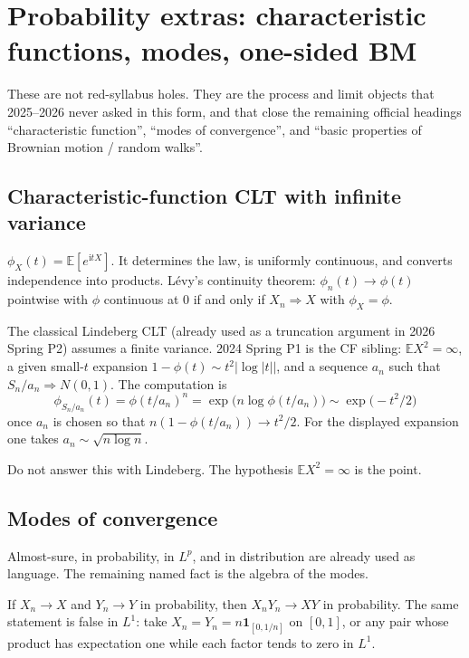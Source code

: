 \section{Probability extras: characteristic functions, modes, one-sided BM}
\label{sec:prob}

These are not red-syllabus holes. They are the process and limit objects that 2025--2026 never asked in this form, and that close the remaining official headings ``characteristic function'', ``modes of convergence'', and ``basic properties of Brownian motion / random walks''.

\subsection{Characteristic-function CLT with infinite variance}

\begin{definition}
\label{def:cf}
\(\phi_{X}(t)=\mathbb{E}[e^{\mathrm{i}tX}]\). It determines the law, is uniformly continuous, and converts independence into products. L\'evy's continuity theorem: \(\phi_{n}(t)\to\phi(t)\) pointwise with \(\phi\) continuous at \(0\) if and only if \(X_{n}\Rightarrow X\) with \(\phi_{X}=\phi\).
\end{definition}

The classical Lindeberg CLT (already used as a truncation argument in 2026 Spring P2) assumes a finite variance. 2024 Spring P1 is the CF sibling: \(\mathbb{E}X^{2}=\infty\), a given small-\(t\) expansion \(1-\phi(t)\sim t^{2}\lvert\log\lvert t\rvert\rvert\), and a sequence \(a_{n}\) such that \(S_{n}/a_{n}\Rightarrow N(0,1)\). The computation is
\[
\phi_{S_{n}/a_{n}}(t)=\phi(t/a_{n})^{n}
=
\exp\bigl(n\log\phi(t/a_{n})\bigr)
\sim
\exp\bigl(-t^{2}/2\bigr)
\]
once \(a_{n}\) is chosen so that \(n(1-\phi(t/a_{n}))\to t^{2}/2\). For the displayed expansion one takes \(a_{n}\sim\sqrt{n\log n}\).

Do not answer this with Lindeberg. The hypothesis \(\mathbb{E}X^{2}=\infty\) is the point.

\subsection{Modes of convergence}

Almost-sure, in probability, in \(L^{p}\), and in distribution are already used as language. The remaining named fact is the algebra of the modes.

\begin{proposition}
\label{prop:modes}
If \(X_{n}\to X\) and \(Y_{n}\to Y\) in probability, then \(X_{n}Y_{n}\to XY\) in probability. The same statement is false in \(L^{1}\): take \(X_{n}=Y_{n}=n\mathbf{1}_{[0,1/n]}\) on \([0,1]\), or any pair whose product has expectation one while each factor tends to zero in \(L^{1}\).
\end{proposition}

